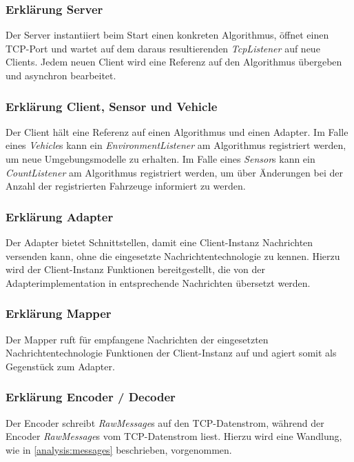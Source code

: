 \subsubsection{Erklärung Server}

Der Server instantiiert beim Start einen konkreten Algorithmus, öffnet einen TCP-Port und wartet auf dem daraus resultierenden \textit{TcpListener} auf neue Clients.
Jedem neuen Client wird eine Referenz auf den Algorithmus übergeben und asynchron bearbeitet.

\subsubsection{Erklärung Client, Sensor und Vehicle}

Der Client hält eine Referenz auf einen Algorithmus und einen Adapter.
Im Falle eines \textit{Vehicle}s kann ein \textit{EnvironmentListener} am Algorithmus registriert werden, um neue Umgebungsmodelle zu erhalten.
Im Falle eines \textit{Sensor}s kann ein \textit{CountListener} am Algorithmus registriert werden, um über Änderungen bei der Anzahl der registrierten Fahrzeuge informiert zu werden.

\subsubsection{Erklärung Adapter}

Der Adapter bietet  Schnittstellen, damit eine Client-Instanz Nachrichten versenden kann, ohne die eingesetzte Nachrichtentechnologie zu kennen.
Hierzu wird der Client-Instanz Funktionen bereitgestellt, die von der Adapterimplementation in entsprechende Nachrichten übersetzt werden.

\subsubsection{Erklärung Mapper}

Der Mapper ruft für empfangene Nachrichten der eingesetzten Nachrichtentechnologie Funktionen der Client-Instanz auf und agiert somit als Gegenstück zum Adapter.

\subsubsection{Erklärung Encoder / Decoder}

Der Encoder schreibt \textit{RawMessage}s auf den TCP-Datenstrom, während der Encoder \textit{RawMessage}s vom TCP-Datenstrom liest.
Hierzu wird eine Wandlung, wie in \autoref{analysis:messages} beschrieben, vorgenommen.

